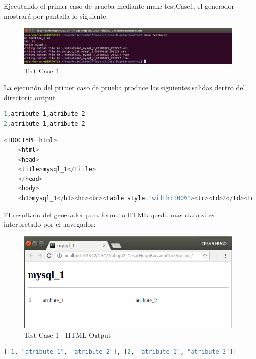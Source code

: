 \documentclass[a4paper,11pt]{book}
\begin{document}
Ejecutando el primer caso de prueba mediante make testCase1, el generador mostrará por pantalla lo siguiente: 

\begin{figure}[H]  
\centering 
\includegraphics[scale=0.35]{imagenes/TestCase1_1.png}
\caption{ Test Case 1  }  
\end{figure} 

La ejecución del primer caso de prueba produce las siguientes salidas dentro del directorio output


\begin{lstlisting}[language=python,caption={Formato CSV }]
1,atribute_1,atribute_2
2,atribute_1,atribute_2
\end{lstlisting}

\begin{lstlisting}[language=python,caption={Formato HTML }]
<!DOCTYPE html>
    <html>
    <head>
    <title>mysql_1</title>
    </head>
    <body>
    <h1>mysql_1</h1><hr><br><table style="width:100%"><tr><td>2</td><td>atribute_1</td><td>atribute_2</td></tr></table></body></html> 
\end{lstlisting}

El resultado del generador para formato HTML queda mas claro si es interpretado por el navegador: 

\begin{figure}[H]  
\centering 
\includegraphics[scale=0.35]{imagenes/TestCase1_html.png}
\caption{ Test Case 1 - HTML Output }  
\end{figure} 


\begin{lstlisting}[language=python,caption={Formato Json }]
[[1, "atribute_1", "atribute_2"], [2, "atribute_1", "atribute_2"]]
\end{lstlisting}
\end{document}
